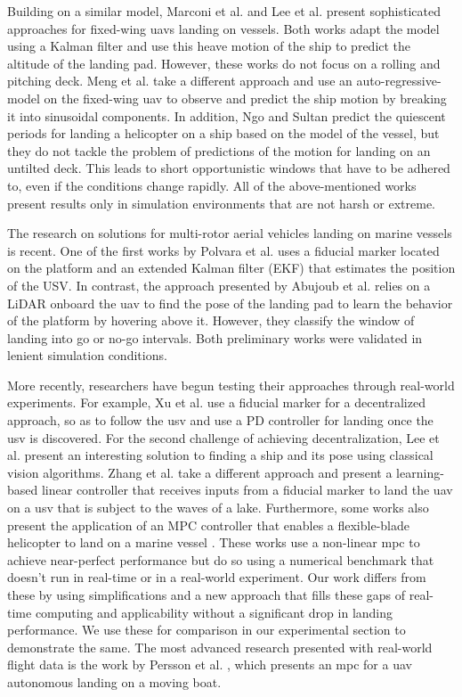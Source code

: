 \documentclass[letterpaper, 10 pt, journal, twoside]{IEEEtran}
\begin{document}
Building on a similar model, Marconi et al. \cite{Marconi2002} and Lee et al. \cite{Lee2019} present sophisticated approaches for fixed-wing \acp{uav} landing on vessels. Both works adapt the model using a Kalman filter and use this heave motion of the ship to predict the altitude of the landing pad. However, these works do not focus on a rolling and pitching deck. Meng et al. \cite{Meng2019} take a different approach and use an auto-regressive-model on the fixed-wing \ac{uav} to observe and predict the ship motion by breaking it into sinusoidal components. In addition, Ngo and Sultan \cite{Ngo2014} predict the quiescent periods for landing a helicopter on a ship based on the model of the vessel, but they do not tackle the problem of predictions of the motion for landing on an untilted deck. This leads to short opportunistic windows that have to be adhered to, even if the conditions change rapidly. All of the above-mentioned works present results only in simulation environments that are not harsh or extreme.

The research on solutions for multi-rotor aerial vehicles landing on marine vessels is recent. One of the first works by Polvara et al. \cite{Polvara2018} uses a fiducial marker located on the platform and an extended Kalman filter (EKF) that estimates the position of the USV. In contrast, the approach presented by Abujoub et al. \cite{Abujoub2019} relies on a LiDAR onboard the \ac{uav} to find the pose of the landing pad to learn the behavior of the platform by hovering above it. However, they classify the window of landing into go or no-go intervals. Both preliminary works were validated in lenient simulation conditions. 

More recently, researchers have begun testing their approaches through real-world experiments. For example, Xu et al. \cite{9188979} use a fiducial marker for a decentralized approach, so as to follow the \ac{usv} and use a PD controller for landing once the \ac{usv} is discovered. For the second challenge of achieving decentralization, Lee et al. \cite{Lee2021} present an interesting solution to finding a ship and its pose using classical vision algorithms. Zhang et al. \cite{Zhang2021} take a different approach and present a learning-based linear controller that receives inputs from a fiducial marker to land the \ac{uav} on a \ac{usv} that is subject to the waves of a lake. Furthermore, some works also present the application of an MPC controller that enables a flexible-blade helicopter to land on a marine vessel \cite{Sultan2020, Sultan2022}. These works use a non-linear \ac{mpc} to achieve near-perfect performance but do so using a numerical benchmark that doesn't run in real-time or in a real-world experiment. Our work differs from these by using simplifications and a new approach that fills these gaps of real-time computing and applicability without a significant drop in landing performance. We use these for comparison in our experimental section to demonstrate the same. The most advanced research presented with real-world flight data is the work by Persson et al. \cite{Persson2019}, which presents an \ac{mpc} for a \ac{uav} autonomous landing on a moving boat. 
\end{document}
